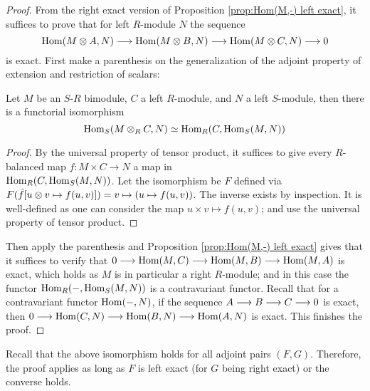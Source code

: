\begin{proof}
    From the right exact version of Proposition \ref{prop:Hom(M,-) left exact}, it suffices to prove that for left $R$-module $N$ the sequence
    \[
        \mathrm{Hom}(M \otimes A, N) \longrightarrow \mathrm{Hom}(M \otimes B, N) \longrightarrow \mathrm{Hom}(M \otimes C, N) \longrightarrow 0
    \]
    is exact. First make a parenthesis on the generalization of the adjoint property of extension and restriction of scalars:

    \begin{parenthesis}
        Let $M$ be an $S$-$R$ bimodule, $C$ a left $R$-module, and $N$ a left $S$-module, then there is a functorial isomorphism
        \[
            \mathrm{Hom}_S(M \otimes_R C, N) \simeq \mathrm{Hom}_R(C, \mathrm{Hom}_S(M, N))
        \]
    \end{parenthesis}

    \begin{proof}
        By the universal property of tensor product, it suffices to give every $R$-balanced map $f: M \times C \to N$ a map in \\ $\mathrm{Hom}_R(C, \mathrm{Hom}_S(M, N))$. Let the isomorphism be $F$ defined via $F(\tilde{f}[u\otimes v \mapsto f(u, v)]) = v\mapsto (u \mapsto f(u, v))$. The inverse exists by inspection. It is well-defined as one can consider the map $u \times v \mapsto f(u, v)$; and use the universal property of tensor product.
    \end{proof}

    Then apply the parenthesis and Proposition \ref{prop:Hom(M,-) left exact} gives that it suffices to verify that $0 \longrightarrow \mathrm{Hom}(M, C) \longrightarrow \mathrm{Hom}(M, B) \longrightarrow \mathrm{Hom}(M, A)$ is exact, which holds as $M$ is in particular a right $R$-module; and in this case the functor $\mathrm{Hom}_R(-, \mathrm{Hom}_S(M, N))$ is a contravariant functor. Recall that for a contravariant functor $\mathrm{Hom}(-, N)$, if the sequence $A \longrightarrow B \longrightarrow C \longrightarrow 0$ is exact, then $0 \longrightarrow \mathrm{Hom}(C, N) \longrightarrow \mathrm{Hom}(B, N) \longrightarrow \mathrm{Hom}(A, N)$ is exact. This finishes the proof.
\end{proof}

\begin{remark}
    Recall that the above isomorphism holds for all adjoint pairs $(F, G)$. Therefore, the proof applies as long as $F$ is left exact (for $G$ being right exact) or the converse holds. 
\end{remark}

